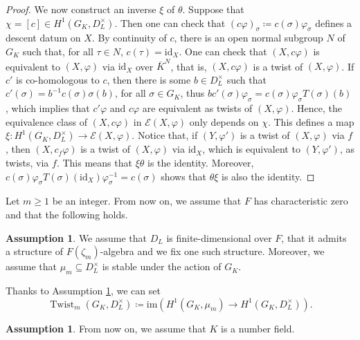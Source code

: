 \documentclass[a4paper,10pt]{amsart}
\theoremstyle{plain}
\theoremstyle{definition}
\newtheorem{assumption}[theorem]{Assumption}
\theoremstyle{remark}
\def\mr#1{\mathrm{#1}}
\def\im{\mr{im}}
\newcommand{\bD}{D_L}
\DeclareMathOperator{\Twist}{Twist}
\begin{document}
\begin{proof}
We now construct an inverse \(\xi\) of \(\theta\). Suppose that \(\chi = [c] \in H^1(G_K, \bD^\times)\). Then one can check that \((c\varphi)_{\sigma} \coloneqq c(\sigma) \varphi_{\sigma}\) defines a descent datum on \(X\). By continuity of \(c\), there is an open normal subgroup \(N\) of \(G_K\) such that, for all \(\tau \in N\), \(c(\tau) = \mr{id}_X.\)
One can check that \((X, c \varphi)\) is equivalent to \((X, \varphi)\) via \(\mr{id}_X\) over \(\overline{K}^N\), that is, \((X, c \varphi)\) is a twist of \((X, \varphi)\).
If \(c'\) is co-homologous to \(c\), then there is some \(b \in \bD^\times\) such that \(c'(\sigma) = b^{-1} c(\sigma) \sigma(b)\), for all \(\sigma \in G_K\), thus
\(b c'(\sigma) \varphi_\sigma = c(\sigma) \varphi_\sigma T(\sigma)(b)\), which implies that \(c'\varphi\) and \(c\varphi\) are equivalent as twists of \((X, \varphi)\). Hence, the equivalence class of \((X, c\varphi)\) in \(\mathcal{E}(X, \varphi)\) only depends on \(\chi\). This defines a map \(\xi \colon H^1(G_K, \bD^\times) \to \mathcal{E}(X, \varphi).\)
Notice that, if \((Y, \varphi')\) is a twist of \((X, \varphi)\) via \(f\), then \((X, c_f\varphi)\) is a twist of \((X, \varphi)\) via \(\mr{id}_X\), which is equivalent to \((Y, \varphi')\), as twists, via \(f\). This means that \(\xi\theta\) is the identity.
Moreover, \(c(\sigma)\varphi_{\sigma}T(\sigma)(\mr{id}_X)\varphi_{\sigma}^{-1} = c(\sigma)\) shows that \(\theta\xi\) is also the identity.
\end{proof}

Let \(m \ge 1\) be an integer. From now on, we assume that \(F\) has characteristic zero and that the following holds.
\begin{assumption}\label{ass1}
We assume that \(\bD\) is finite-dimensional over \(F\), that it admits a structure of \(F(\zeta_m)\)-algebra and we fix one such structure. Moreover, we assume that \(\mu_m \subseteq \bD^\times\) is stable under the action of \(G_K\).
\end{assumption}

Thanks to Assumption \ref{ass1}, we can set
\[
    \Twist_m(G_K, \bD^\times) \coloneqq \im(H^1(G_K, \mu_m) \to H^1(G_K, \bD^\times)).
\]

\begin{assumption}\label{ass: number field}
From now on, we assume that \(K\) is a number field.
\end{assumption}
\end{document}
